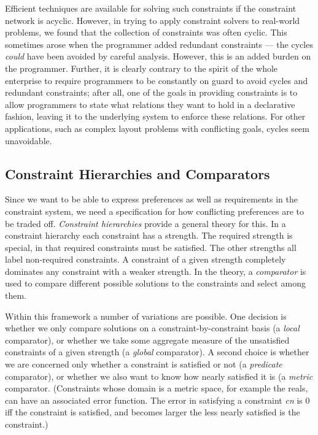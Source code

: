 \documentclass{article}
\newcommand{\strength}{\sf}
\begin{document}
Efficient techniques are available for solving such constraints if the
constraint network is acyclic.  However, in trying to apply constraint
solvers to real-world problems, we found that the collection of constraints
was often cyclic.  This sometimes arose when the programmer
added redundant constraints --- the cycles {\em could} have been avoided by
careful analysis.  However, this is an added burden on the programmer.
Further, it is clearly contrary to the spirit of the whole enterprise to
require programmers to be constantly on guard to avoid cycles and redundant
constraints; after all, one of the goals in providing constraints is to
allow programmers to state what relations they want to hold in a
declarative fashion, leaving it to the underlying system to enforce these
relations.  For other applications, such as complex layout problems with
conflicting goals,  cycles seem unavoidable.

\subsection{Constraint Hierarchies and Comparators}

Since we want to be able to express preferences as well as requirements in
the constraint system, we need a specification for how conflicting
preferences are to be traded off.  {\em Constraint hierarchies}
\cite{borning-lisp-symbolic-computation-92} provide a general theory for
this.  In a constraint hierarchy each constraint has a strength.  The
{\strength required} strength is special, in that {\strength required}
constraints must be satisfied.  The other strengths all label non-required
constraints.  A constraint of a given strength completely dominates any
constraint with a weaker strength.  In the theory, a {\em comparator} is
used to compare different possible solutions to the constraints and select
among them.

Within this framework a number of variations are possible.  One decision is
whether we only compare solutions on a constraint-by-constraint basis (a
{\em local} comparator), or whether we take some aggregate measure of the
unsatisfied constraints of a given strength (a {\em global} comparator).  A
second choice is whether we are concerned only whether a constraint is
satisfied or not (a {\em predicate} comparator), or whether we also want to
know how nearly satisfied it is (a {\em metric} comparator.  (Constraints
whose domain is a metric space, for example the reals, can have an
associated error function.  The error in satisfying a constraint {\em cn}
is 0 iff the constraint is satisfied, and becomes larger the less nearly
satisfied is the constraint.)
\end{document}
